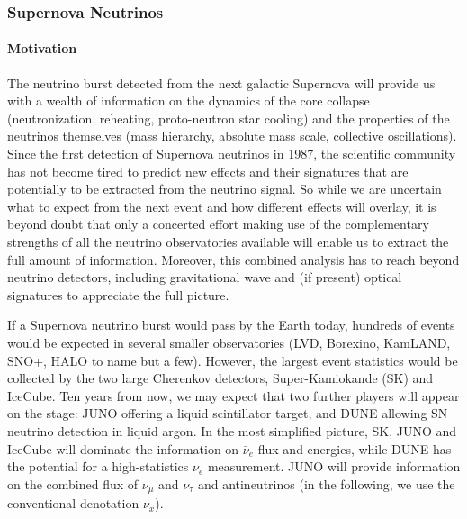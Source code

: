 \subsubsection{Supernova Neutrinos}

\paragraph{Motivation}

The neutrino burst detected from the next galactic Supernova will provide us with a wealth of information on the dynamics of the core collapse (neutronization, reheating, proto-neutron star cooling) and the properties of the neutrinos themselves (mass hierarchy, absolute mass scale, collective oscillations). Since the first detection of Supernova neutrinos in 1987, the scientific community has not become tired to predict new effects and their signatures that are potentially to be extracted from the neutrino signal. So while we are uncertain what to expect from the next event and how different effects will overlay, it is beyond doubt that only a concerted effort making use of the complementary strengths of all the neutrino observatories available will enable us to extract the full amount of information. Moreover, this combined analysis has to reach beyond neutrino detectors, including gravitational wave and (if present) optical signatures to appreciate the full picture.

If a Supernova neutrino burst would pass by the Earth today, hundreds of events would be expected in several smaller observatories (LVD, Borexino, KamLAND, SNO+, HALO to name but a few). However, the largest event statistics would be collected by the two large Cherenkov detectors, Super-Kamiokande (SK) and IceCube. Ten years from now, we may expect that two further players will appear on the stage: JUNO offering a liquid scintillator target, and DUNE allowing SN neutrino detection in liquid argon. In the most simplified picture, SK, JUNO and IceCube will dominate the information on $\bar\nu_e$ flux and energies, while DUNE has the potential for a high-statistics $\nu_e$ measurement. JUNO will provide information on the combined flux of $\nu_\mu$ and $\nu_\tau$ and antineutrinos (in the following, we use the conventional denotation $\nu_x$).

